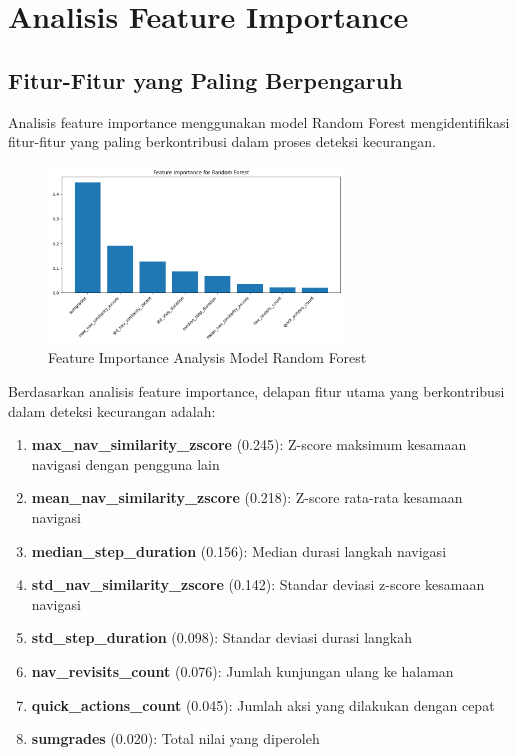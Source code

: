 \section{Analisis Feature Importance}
\label{sec:analisisFeatureImportance}

\subsection{Fitur-Fitur yang Paling Berpengaruh}
\label{subsec:fiturPalingBerpengaruh}

Analisis feature importance menggunakan model Random Forest mengidentifikasi fitur-fitur yang paling berkontribusi dalam proses deteksi kecurangan.

\begin{figure}[htbp]
    \centering
    \includegraphics[width=0.7\textwidth]{figures/feature_importance_Random Forest.png}
    \caption{Feature Importance Analysis Model Random Forest}
    \label{fig:featureImportance}
\end{figure}

Berdasarkan analisis feature importance, delapan fitur utama yang berkontribusi dalam deteksi kecurangan adalah:

\begin{enumerate}
    \item \textbf{max\_nav\_similarity\_zscore} (0.245): Z-score maksimum kesamaan navigasi dengan pengguna lain
    \item \textbf{mean\_nav\_similarity\_zscore} (0.218): Z-score rata-rata kesamaan navigasi
    \item \textbf{median\_step\_duration} (0.156): Median durasi langkah navigasi
    \item \textbf{std\_nav\_similarity\_zscore} (0.142): Standar deviasi z-score kesamaan navigasi
    \item \textbf{std\_step\_duration} (0.098): Standar deviasi durasi langkah
    \item \textbf{nav\_revisits\_count} (0.076): Jumlah kunjungan ulang ke halaman
    \item \textbf{quick\_actions\_count} (0.045): Jumlah aksi yang dilakukan dengan cepat
    \item \textbf{sumgrades} (0.020): Total nilai yang diperoleh
\end{enumerate}

